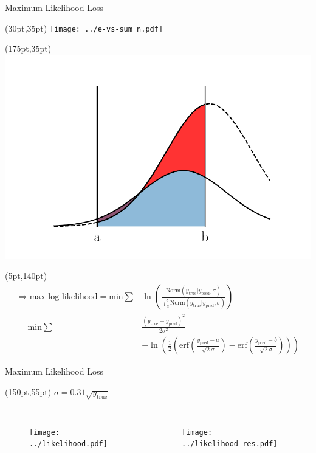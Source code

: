\documentclass[10pt]{beamer}
\begin{document}
\begin{frame}{Maximum Likelihood Loss}
  \begin{textblock*}{150pt}(30pt,35pt)
      \texttt{[image: ../e-vs-sum\_n.pdf]}
  \end{textblock*}
  \begin{textblock*}{150pt}(175pt,35pt)
    \includegraphics[width=\textwidth]{./gaussian_shift.pdf}
  \end{textblock*}

  \begin{textblock*}{150pt}(5pt,140pt)
    \begin{align*}
      \Rightarrow \text{max log likelihood} = \text{min} \sum& \ln(\frac{\text{Norm}(y_{\text{true}} | y_{\text{pred}}, \sigma)}{\int^b_a \text{Norm}(y_{\text{true}} | y_{\text{pred}}, \sigma)})\\
                                            =\text{min} \sum& \frac{(y_{\text{true}}-y_{\text{pred}})^2}{2 \sigma^2}\\
   &+\ln(\frac{1}{2} \left(\text{erf}(\frac{y_{\text{pred}}-a}{\sqrt{2}\sigma}) - \text{erf}(\frac{y_{\text{pred}}-b}{\sqrt{2}\sigma})\right))
    \end{align*}
  \end{textblock*}
\end{frame}

\begin{frame}{Maximum Likelihood Loss}
  \begin{textblock*}{150pt}(150pt,55pt)
    $\sigma = 0.31 \sqrt{y_{\text{true}}}$
  \end{textblock*}
  \begin{columns}
    \begin{figure}[htp]
      \texttt{[image: ../likelihood.pdf]}
    \end{figure}
    \begin{figure}[htp]
      \texttt{[image: ../likelihood\_res.pdf]}
    \end{figure}
  \end{columns}
\end{frame}
\end{document}

